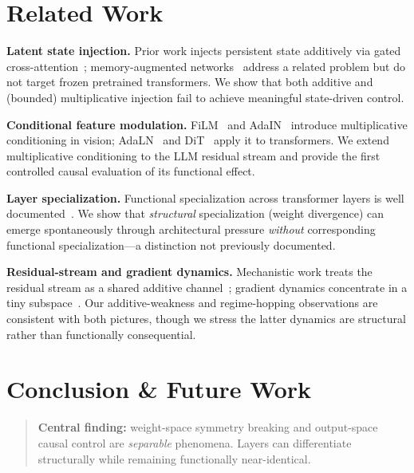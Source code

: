 \documentclass[11pt,a4paper]{article}
\begin{document}
\section{Related Work}

\textbf{Latent state injection.} Prior work injects persistent state additively via
gated cross-attention~\cite{sukhbaatar2019augmenting, wu2022memorizing}; memory-augmented
networks~\cite{graves2016hybrid} address a related problem but do not target frozen
pretrained transformers. We show that both additive and (bounded) multiplicative
injection fail to achieve meaningful state-driven control.

\textbf{Conditional feature modulation.} FiLM~\cite{perez2018film} and
AdaIN~\cite{huang2017arbitrary} introduce multiplicative conditioning in vision;
AdaLN~\cite{ba2016layer} and DiT~\cite{peebles2023scalable} apply it to transformers.
We extend multiplicative conditioning to the LLM residual stream and provide the first
controlled causal evaluation of its functional effect.

\textbf{Layer specialization.} Functional specialization across transformer layers is
well documented~\cite{tenney2019bert, clark2019does, rogers2020primer}. We show that
\emph{structural} specialization (weight divergence) can emerge spontaneously through
architectural pressure \emph{without} corresponding functional specialization---a
distinction not previously documented.

\textbf{Residual-stream and gradient dynamics.} Mechanistic work treats the residual
stream as a shared additive channel~\cite{elhage2021mathematical}; gradient dynamics
concentrate in a tiny subspace~\cite{gurari2018gradient}. Our additive-weakness and
regime-hopping observations are consistent with both pictures, though we stress the
latter dynamics are structural rather than functionally consequential.

\section{Conclusion \& Future Work}

\begin{quote}
  \textbf{Central finding:} weight-space symmetry breaking and output-space causal
  control are \emph{separable} phenomena. Layers can differentiate structurally while
  remaining functionally near-identical.
\end{quote}
\end{document}

